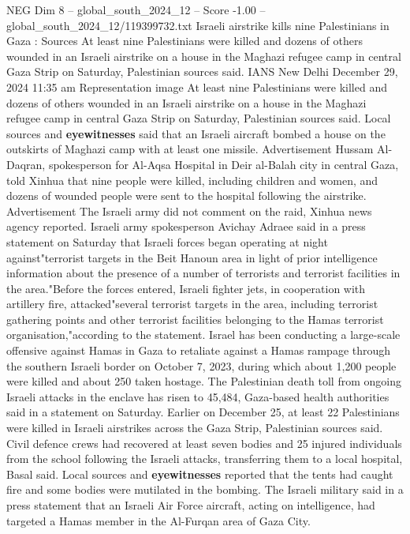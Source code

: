 \begin{textsample}{NEG Dim 8 – global\_south\_2024\_12 – Score -1.00 – global\_south\_2024\_12/119399732.txt}  \label{ex:f8_neg_107}
Israeli airstrike kills nine Palestinians in Gaza : Sources At least nine Palestinians were killed and dozens of others wounded in an Israeli airstrike on a house in the Maghazi refugee camp in central Gaza Strip on Saturday, Palestinian sources said.
IANS New Delhi December 29, 2024 11:35 am Representation image At least nine Palestinians were killed and dozens of others wounded in an Israeli airstrike on a house in the Maghazi refugee camp in central Gaza Strip on Saturday, Palestinian sources said.
Local sources and \textbf{eyewitnesses} said that an Israeli aircraft bombed a house on the outskirts of Maghazi camp with at least one missile.
Advertisement Hussam Al-Daqran, spokesperson for Al-Aqsa Hospital in Deir al-Balah city in central Gaza, told Xinhua that nine people were killed, including children and women, and dozens of wounded people were sent to the hospital following the airstrike.
Advertisement The Israeli army did not comment on the raid, Xinhua news agency reported.
Israeli army spokesperson Avichay Adraee said in a press statement on Saturday that Israeli forces began operating at night against"terrorist targets in the Beit Hanoun area in light of prior intelligence information about the presence of a number of terrorists and terrorist facilities in the area."Before the forces entered, Israeli fighter jets, in cooperation with artillery fire, attacked"several terrorist targets in the area, including terrorist gathering points and other terrorist facilities belonging to the Hamas terrorist organisation,"according to the statement.
Israel has been conducting a large-scale offensive against Hamas in Gaza to retaliate against a Hamas rampage through the southern Israeli border on October 7, 2023, during which about 1,200 people were killed and about 250 taken hostage.
The Palestinian death toll from ongoing Israeli attacks in the enclave has risen to 45,484, Gaza-based health authorities said in a statement on Saturday.
Earlier on December 25, at least 22 Palestinians were killed in Israeli airstrikes across the Gaza Strip, Palestinian sources said.
Civil defence crews had recovered at least seven bodies and 25 injured individuals from the school following the Israeli attacks, transferring them to a local hospital, Basal said.
Local sources and \textbf{eyewitnesses} reported that the tents had caught fire and some bodies were mutilated in the bombing.
The Israeli military said in a press statement that an Israeli Air Force aircraft, acting on intelligence, had targeted a Hamas member in the Al-Furqan area of Gaza City.

\end{textsample}
